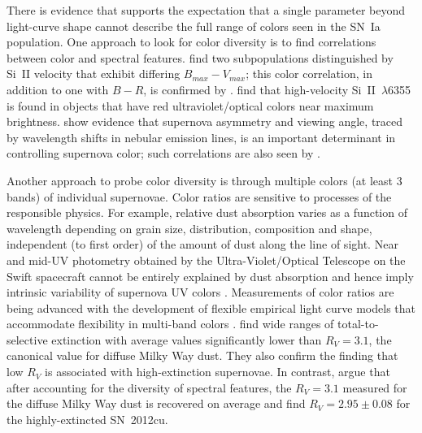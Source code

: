 \documentclass[trackchanges]{aastex62}   	%
\begin{document}
There is evidence that supports the expectation that a single parameter beyond light-curve shape  cannot describe the full range
of colors seen in the SN~Ia population.  One approach to look for color diversity is to find correlations between color and spectral features.
\citet{2009ApJ...699L.139W, 2011ApJ...729...55F} find two subpopulations distinguished
by Si~II velocity that exhibit differing $B_{\mathit{\mathit{max}}}-V_{\mathit{max}}$; this color correlation, in addition to one with $B-R$, is confirmed by
\citet{2014ApJ...797...75M}.
\citet{2009ApJ...699L.139W,2015MNRAS.451.1973S}
find that high-velocity Si~II~$\lambda$6355 is found in objects that have red ultraviolet/optical colors near maximum brightness.
\citet{2011MNRAS.413.3075M} show evidence that supernova asymmetry and viewing angle,
traced by wavelength shifts in nebular emission lines, is an important determinant in controlling supernova color; such correlations are also seen by \citet{2011A&A...534L..15C}.

Another approach to probe color diversity is through multiple colors (at least 3 bands)
of individual supernovae.  Color ratios are sensitive to processes of the responsible physics.   For example,
relative dust absorption varies as a function of wavelength depending on grain size, distribution, composition and shape,
independent (to first order) of the amount of dust along the line of sight.
Near and mid-UV photometry obtained by the Ultra-Violet/Optical Telescope on the Swift spacecraft cannot be entirely explained
by dust absorption and hence imply intrinsic variability of supernova UV colors
\citep{2017ApJ...836..232B}.
Measurements of color ratios are being advanced with the development of flexible empirical light curve models that accommodate flexibility in multi-band colors
\citep[e.g.][]{2011ApJ...731..120M}.
\citet{2014ApJ...789...32B, 2015MNRAS.453.3300A} find wide
ranges of total-to-selective extinction with average values significantly lower than $R_V = 3.1$,
the canonical value for diffuse Milky Way dust.
They also confirm the \citet{2006MNRAS.369.1880E, 2011ApJ...731..120M} finding that low $R_V$ is associated with high-extinction supernovae.
In contrast, \citet{2011A&A...529L...4C} argue that after accounting for the diversity of spectral features,
the $R_V=3.1$ measured for the diffuse Milky Way dust is recovered on average and \citet{2017ApJ...836..157H}
find $R_V=2.95 \pm 0.08$ for the highly-extincted SN~2012cu.
\end{document}
